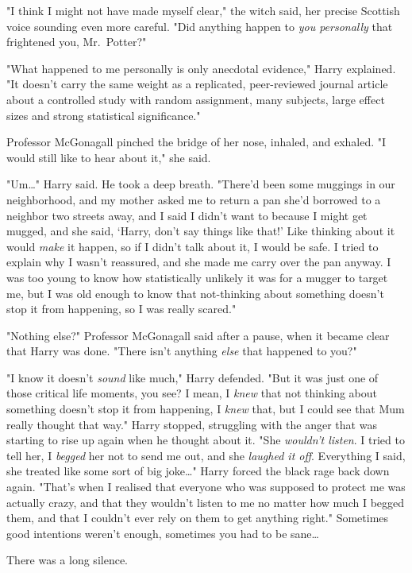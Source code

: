 "I think I might not have made myself clear," the witch said, her precise
Scottish voice sounding even more careful. "Did anything happen to \emph{you
personally} that frightened you, Mr.~Potter?"

"What happened to me personally is only anecdotal evidence," Harry explained.
"It doesn't carry the same weight as a replicated, peer-reviewed journal
article about a controlled study with random assignment, many subjects, large
effect sizes and strong statistical significance."

Professor McGonagall pinched the bridge of her nose, inhaled, and exhaled. "I
would still like to hear about it," she said.

"Um{\ldots}" Harry said. He took a deep breath. "There'd been some muggings in
our neighborhood, and my mother asked me to return a pan she'd borrowed to a
neighbor two streets away, and I said I didn't want to because I might get
mugged, and she said, `Harry, don't say things like that!' Like thinking about
it would \emph{make} it happen, so if I didn't talk about it, I would be safe.
I tried to explain why I wasn't reassured, and she made me carry over the pan
anyway. I was too young to know how statistically unlikely it was for a mugger
to target me, but I was old enough to know that not-thinking about something
doesn't stop it from happening, so I was really scared."

"Nothing else?" Professor McGonagall said after a pause, when it became clear
that Harry was done. "There isn't anything \emph{else} that happened to you?"

"I know it doesn't \emph{sound} like much," Harry defended. "But it was just
one of those critical life moments, you see? I mean, I \emph{knew} that not
thinking about something doesn't stop it from happening, I \emph{knew} that,
but I could see that Mum really thought that way." Harry stopped, struggling
with the anger that was starting to rise up again when he thought about it.
"She \emph{wouldn't listen}. I tried to tell her, I \emph{begged} her not to
send me out, and she \emph{laughed it off}. Everything I said, she treated like
some sort of big joke{\ldots}" Harry forced the black rage back down again.
"That's when I realised that everyone who was supposed to protect me was
actually crazy, and that they wouldn't listen to me no matter how much I begged
them, and that I couldn't ever rely on them to get anything right." Sometimes
good intentions weren't enough, sometimes you had to be sane{\ldots}

There was a long silence.

